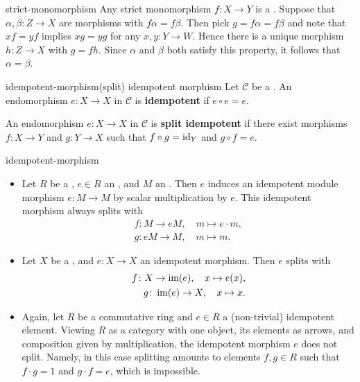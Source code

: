 \begin{example}{strict-monomorphism}
    Any strict monomorphism $f \colon X \to Y$ is a . Suppose that $\alpha, \beta \colon Z \to X$ are morphisms with $f \alpha = f \beta$. Then pick $g = f \alpha = f \beta$ and note that $xf = yf$ implies $xg = yg$ for any $x, y \colon Y \to W$. Hence there is a unique morphism $h \colon Z \to X$ with $g = fh$. Since $\alpha$ and $\beta$ both satisfy this property, it follows that $\alpha = \beta$.
\end{example}

\begin{topic}{idempotent-morphism}{(split) idempotent morphism}
    Let $\mathcal{C}$ be a . An endomorphism $e \colon X \to X$ in $\mathcal{C}$ is \textbf{idempotent} if $e \circ e = e$.
    
    An endomorphism $e \colon X \to X$ in $\mathcal{C}$ is \textbf{split idempotent} if there exist morphisms $f \colon X \to Y$ and $g \colon Y \to X$ such that $f \circ g = \textup{id}_Y$ and $g \circ f = e$.
\end{topic}

\begin{example}{idempotent-morphism}
    \begin{itemize}
        \item Let $R$ be a , $e \in R$ an , and $M$ an . Then $e$ induces an idempotent module morphism $e \colon M \to M$ by scalar multiplication by $e$. This idempotent morphism always splits with
        \[ \begin{aligned}
            f \colon M \to eM, \quad m \mapsto e \cdot m , \\
            g \colon eM \to M, \quad m \mapsto m .
        \end{aligned} \]
        \item Let $X$ be a , and $e \colon X \to X$ an idempotent morphism. Then $e$ splits with
        \[ \begin{aligned}
            f \colon X \to \operatorname{im}(e), \quad x \mapsto e(x) , \\
            g \colon \operatorname{im}(e) \to X, \quad x \mapsto x .
        \end{aligned} \]
        \item Again, let $R$ be a commutative ring and $e \in R$ a (non-trivial) idempotent element. Viewing $R$ as a category with one object, its elements as arrows, and composition given by multiplication, the idempotent morphism $e$ does not split. Namely, in this case splitting amounts to elements $f, g \in R$ such that $f \cdot g = 1$ and $g \cdot f = e$, which is impossible.
    \end{itemize}
\end{example}


